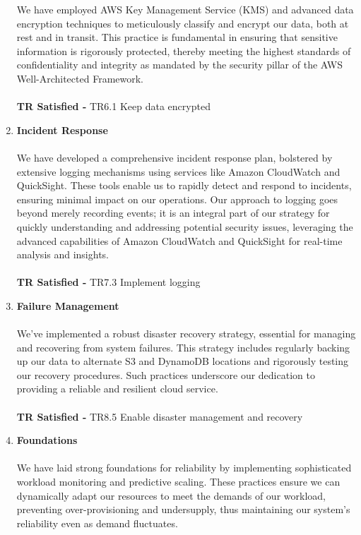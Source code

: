 \documentclass{article}
\begin{document}
\begin{enumerate}
    We have employed AWS Key Management Service (KMS) and advanced data encryption techniques to meticulously classify and encrypt our data, both at rest and in transit. This practice is fundamental in ensuring that sensitive information is rigorously protected, thereby meeting the highest standards of confidentiality and integrity as mandated by the security pillar of the AWS Well-Architected Framework.\\\\
    \textbf{TR Satisfied -} TR6.1 Keep data encrypted
    \item \textbf{Incident Response}\cite{Incident response} \\\\
    We have developed a comprehensive incident response plan, bolstered by extensive logging mechanisms using services like Amazon CloudWatch and QuickSight. These tools enable us to rapidly detect and respond to incidents, ensuring minimal impact on our operations. Our approach to logging goes beyond merely recording events; it is an integral part of our strategy for quickly understanding and addressing potential security issues, leveraging the advanced capabilities of Amazon CloudWatch and QuickSight for real-time analysis and insights.\\\\
    \textbf{TR Satisfied -} TR7.3 Implement logging
     \item \textbf{Failure Management}\cite{Failure management} \\\\
    We've implemented a robust disaster recovery strategy, essential for managing and recovering from system failures. This strategy includes regularly backing up our data to alternate S3 and DynamoDB locations and rigorously testing our recovery procedures. Such practices underscore our dedication to providing a reliable and resilient cloud service.\\\\
    \textbf{TR Satisfied -} TR8.5 Enable disaster management and recovery
    \item \textbf{Foundations}\cite{Foundations} \\\\
    We have laid strong foundations for reliability by implementing sophisticated workload monitoring and predictive scaling. These practices ensure we can dynamically adapt our resources to meet the demands of our workload, preventing over-provisioning and undersupply, thus maintaining our system's reliability even as demand fluctuates.\\\\

\end{enumerate}
\end{document}
